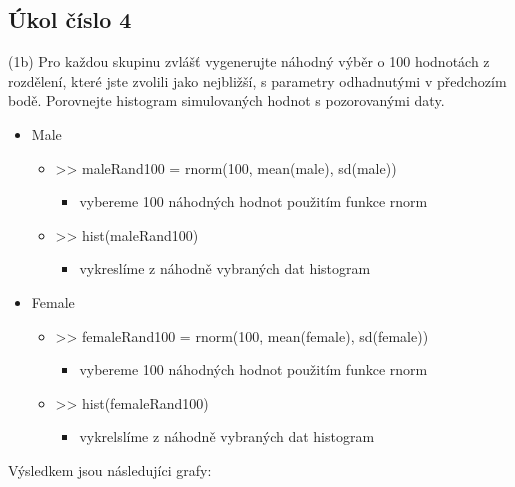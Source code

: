 \documentclass[paper=a4, fontsize=12pt]{scrartcl}
\numberwithin{equation}{section}		%
\numberwithin{figure}{section}			%
\numberwithin{table}{section}				%
\begin{document}
\subsection{Úkol číslo 4}
(1b) Pro každou skupinu zvlášť vygenerujte náhodný výběr o 100 hodnotách z rozdělení, které jste zvolili jako nejbližší, 
s parametry odhadnutými v předchozím bodě. Porovnejte histogram simulovaných hodnot s pozorovanými daty.
\begin{itemize}
	\item Male
		\begin{itemize}
			\item >> maleRand100 = rnorm(100, mean(male), sd(male))
				\begin{itemize}
				\item vybereme 100 náhodných hodnot použitím funkce rnorm
				\end{itemize}
			\item >> hist(maleRand100)
				\begin{itemize}
				\item vykreslíme z náhodně vybraných dat histogram
				\end{itemize}
		\end{itemize}
	\item Female
		\begin{itemize}
			\item >> femaleRand100 = rnorm(100, mean(female), sd(female))
				\begin{itemize}
				\item vybereme 100 náhodných hodnot použitím funkce rnorm
				\end{itemize}
			\item >> hist(femaleRand100)
				\begin{itemize}
				\item vykrelslíme z náhodně vybraných dat histogram 
				\end{itemize}
		\end{itemize}
\end{itemize}
\newpage
Výsledkem jsou následujíci grafy:
\end{document}
